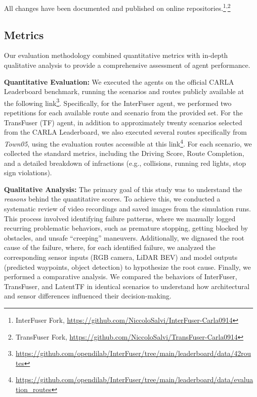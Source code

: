 All changes have been documented and published on online repositories.\footnote{InterFuser Fork, \url{https://github.com/NiccoloSalvi/InterFuser-Carla0914}}\textsuperscript{,}\footnote{TransFuser Fork, \url{https://github.com/NiccoloSalvi/TransFuser-Carla0914}}

\subsection{Metrics}
\label{subsec:metrics}
Our evaluation methodology combined quantitative metrics with in-depth qualitative analysis to provide a comprehensive assessment of agent performance.

\noindent\textbf{Quantitative Evaluation:} We executed the agents on the official CARLA Leaderboard benchmark, running the scenarios and routes publicly available at the following link\footnote{\url{https://github.com/opendilab/InterFuser/tree/main/leaderboard/data/42routes}}.
Specifically, for the InterFuser agent, we performed two repetitions for each available route and scenario from the provided set. For the TransFuser (TF) agent, in addition to approximately twenty scenarios selected from the CARLA Leaderboard, we also executed several routes specifically from \textit{Town05}, using the evaluation routes accessible at this link\footnote{\url{https://github.com/opendilab/InterFuser/tree/main/leaderboard/data/evaluation_routes}}.
For each scenario, we collected the standard metrics, including the Driving Score, Route Completion, and a detailed breakdown of infractions (e.g., collisions, running red lights, stop sign violations).

\noindent\textbf{Qualitative Analysis:} The primary goal of this study was to understand the \textit{reasons} behind the quantitative scores. To achieve this, we conducted a systematic review of video recordings and saved images from the simulation runs. This process involved identifying failure patterns, where we manually logged recurring problematic behaviors, such as premature stopping, getting blocked by obstacles, and unsafe ``creeping'' maneuvers.
Additionally, we dignased the root cause of the failure, where, for each identified failure, we analyzed the corresponding sensor inputs (RGB camera, LiDAR BEV) and model outputs (predicted waypoints, object detection) to hypothesize the root cause.
Finally, we performed a comparative analysis. We compared the behaviors of InterFuser, TransFuser, and LatentTF in identical scenarios to understand how architectural and sensor differences influenced their decision-making.

